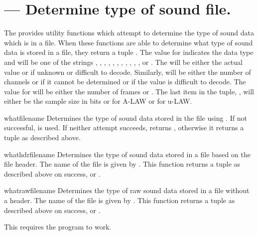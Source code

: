 \section{ ---
         Determine type of sound file.}



The  provides utility functions which attempt to
determine the type of sound data which is in a file.  When these
functions are able to determine what type of sound data is stored in a
file, they return a tuple .  The value for
 indicates the data type and will be one of the strings
, , , ,
, , , ,
, , , or .  The
 will be either the actual value or  if
unknown or difficult to decode.  Similarly,  will be
either the number of channels or  if it cannot be determined
or if the value is difficult to decode.  The value for 
will be either the number of frames or .  The last item in
the tuple, , will either be the sample size in
bits or  for A-LAW or  for
u-LAW.


\begin{funcdesc}{what}{filename}
  Determines the type of sound data stored in the file 
  using .  If not successful,  
  is used.  If neither attempt succeeds, returns ,
  otherwise it returns a tuple as described above.
\end{funcdesc}


\begin{funcdesc}{whathdr}{filename}
  Determines the type of sound data stored in a file based on the file 
  header.  The name of the file is given by .  This
  function returns a tuple as described above on success, or
  .
\end{funcdesc}


\begin{funcdesc}{whatraw}{filename}
  Determines the type of raw sound data stored in a file without a
  header.  The name of the file is given by .  This
  function returns a tuple as described above on success, or
  .

  This requires the  program to work.
\end{funcdesc}
